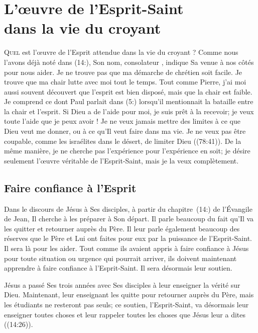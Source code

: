\chapter[L'\oe{}uvre de l'Esprit-Saint dans la vie du croyant]{L'\oe{}uvre de l'Esprit-Saint\\ dans la vie du croyant}

\lettrine{Q}{uel} est l'œuvre de l'Esprit
 attendue dans la vie du croyant ?
 Comme nous l'avons déjà noté dans (14:), Son nom,
 \og con\-so\-la\-teur \fg{}, indique Sa venue à nos côtés pour nous aider.
 Je ne trouve pas que ma démarche de chrétien soit facile.
 Je trouve que ma chair lutte avec moi tout le temps.
 Tout comme Pierre, j'ai moi aussi souvent découvert que l'esprit
 est bien disposé, mais que la chair est faible.
 Je comprend ce dont Paul parlait dans (5:) lorsqu'il
 mentionnait la bataille entre la chair et l'esprit.
 Si Dieu a de l'aide pour moi, je suis prêt à la recevoir;
 je veux toute l'aide que je peux avoir !
 Je ne veux jamais mettre des limites à ce que Dieu veut me donner,
 ou à ce qu'Il veut faire dans ma vie. Je ne veux pas être coupable,
 comme les israélites dans le désert,
 de limiter Dieu ((78:41)).
 De la même manière, je ne cherche pas l'expérience
 pour l'expérience en soit; je désire seulement l'œuvre véritable
 de l'Esprit-Saint, mais je la veux complètement.

\section{Faire confiance \`a l'Esprit}

Dans le discours de Jésus à Ses disciples, à partir du chapitre~(14:)
 de l'Évangile de Jean, Il cherche à les préparer à Son départ.
 Il parle beaucoup du fait qu'Il va les quitter et retourner auprès du Père.
 Il leur parle également beaucoup des réserves que le Père et Lui
 ont faites pour eux par la puissance de l'Esprit-Saint.
 Il sera là pour les aider. Tout comme ils avaient appris à faire confiance
 à Jésus pour toute situation ou urgence qui pourrait arriver,
 ils doivent maintenant apprendre à faire confiance à l'Esprit-Saint.
 Il sera désormais leur soutien.

Jésus a passé Ses trois années avec Ses disciples à leur enseigner
 la vérité sur Dieu. Maintenant, leur enseignant les quitte pour retourner
 auprès du Père, mais les étudiants ne resteront pas seuls;
 ce soutien, l'Esprit-Saint, va désormais leur enseigner toutes choses
 et leur rappeler toutes les choses que Jésus leur a dites
 ((14:26)).

